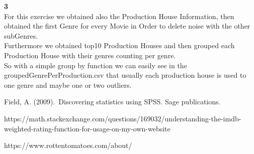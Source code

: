 \documentclass[a4paper]{article}
\begin{document}
	\textbf{3}\\
	For this exercise we obtained also the Production House Information, then obtained the first Genre for every Movie in Order to delete noise with the other subGenres.\\
	Furthermore we obtained top10 Production Houses and then grouped each Production House with their genres counting per genre.\\
	So with a simple group by function we can easily see in the groupedGenrePerProduction.csv that usually each production house is used to one genre and maybe one or two outliers.

\newpage
\begin{thebibliography}{9}
	Field, A. (2009). Discovering statistics using SPSS. Sage publications. 
	
	https://math.stackexchange.com/questions/169032/understanding-the-imdb-weighted-rating-function-for-usage-on-my-own-website
	
	https://www.rottentomatoes.com/about/
\end{thebibliography}
\end{document}
